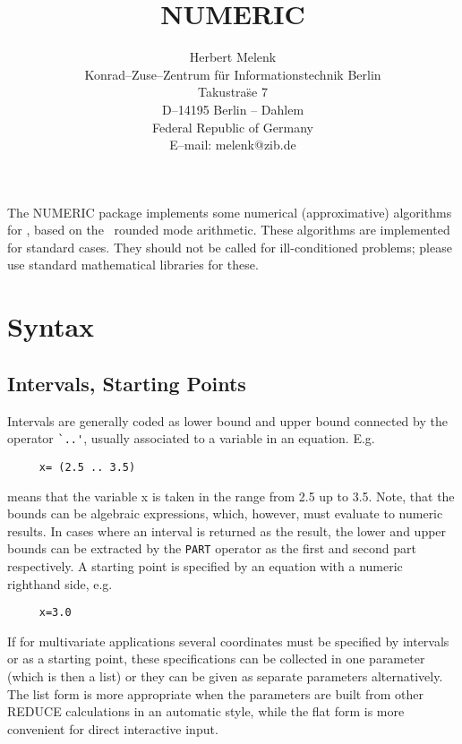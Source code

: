 \date{}
\title{NUMERIC}
\author{Herbert Melenk \\
Konrad--Zuse--Zentrum f\"ur Informationstechnik Berlin \\
Takustra\"se 7 \\
D--14195 Berlin -- Dahlem \\
Federal Republic of Germany \\[0.05in]
E--mail: melenk@zib.de}

\maketitle

The {\small NUMERIC} package implements some numerical (approximative)
algorithms for \REDUCE, based on the \REDUCE\ rounded mode
arithmetic. These algorithms are implemented for standard cases.
They should not be called for ill-conditioned problems;
please use standard mathematical libraries for these.

\section{Syntax}

\subsection{Intervals, Starting Points}

Intervals are generally coded as lower bound and
upper bound connected by the operator \verb+`..'+, usually
associated to a variable in an
equation. E.g.

\begin{verbatim}
     x= (2.5 .. 3.5)
\end{verbatim}

means that the variable x is taken in the range from 2.5 up to
3.5. Note, that the bounds can be algebraic
expressions, which, however, must evaluate to numeric results.
In cases where an interval is returned as the result, the lower
and upper bounds can be extracted by the \verb+PART+ operator
as the first and second part respectively.
A starting point is specified by an equation with a numeric
righthand side, e.g.

\begin{verbatim}
     x=3.0
\end{verbatim}

If for multivariate applications several coordinates must be
specified by intervals or as a starting point, these
specifications can be collected in one parameter (which is then
a list) or they can be given as separate parameters
alternatively. The list form is more appropriate when the
parameters are built from other REDUCE calculations in an
automatic style, while the flat form is more convenient
for direct interactive input.

